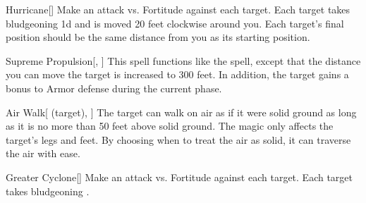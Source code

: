 \lowercase{\hypertarget{spell:Hurricane}{}}\label{spell:Hurricane}
\begin{freeability}[Rank 5]{\hypertarget{spell:Hurricane}{Hurricane}}[]
Make an attack vs. Fortitude against each target.
\hit Each target takes bludgeoning  \minus1d and is moved 20 feet clockwise around you.
Each target's final position should be the same distance from you as its starting position.
\end{freeability}
\vspace{0.25em}



\lowercase{\hypertarget{spell:Supreme Propulsion}{}}\label{spell:Supreme Propulsion}
\begin{freeability}[Rank 5]{\hypertarget{spell:Supreme Propulsion}{Supreme Propulsion}}[, ]
This spell functions like the  spell, except that the distance you can move the target is increased to 300 feet.
In addition, the target gains a  bonus to Armor defense during the current phase.
\end{freeability}
\vspace{0.25em}



\lowercase{\hypertarget{spell:Air Walk}{}}\label{spell:Air Walk}
\begin{attuneability}[Rank 6]{\hypertarget{spell:Air Walk}{Air Walk}}[ (target), ]
The target can walk on air as if it were solid ground as long as it is no more than 50 feet above solid ground.
The magic only affects the target's legs and feet.
By choosing when to treat the air as solid, it can traverse the air with ease.
\end{attuneability}
\vspace{0.25em}



\lowercase{\hypertarget{spell:Greater Cyclone}{}}\label{spell:Greater Cyclone}
\begin{freeability}[Rank 6]{\hypertarget{spell:Greater Cyclone}{Greater Cyclone}}[]
Make an attack vs. Fortitude against each target.
\hit Each target takes bludgeoning .
\end{freeability}
\vspace{0.25em}



